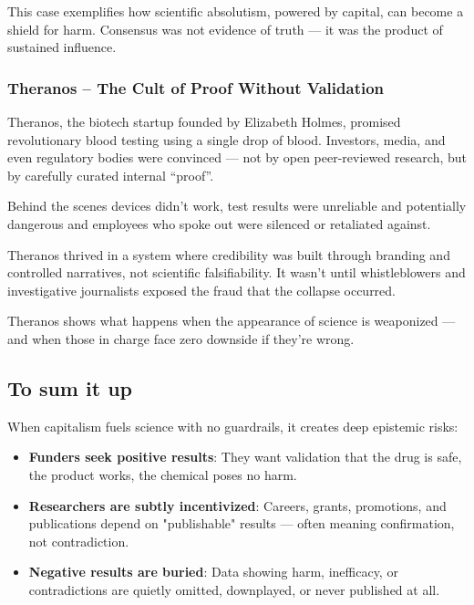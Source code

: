 This case exemplifies how scientific absolutism, powered by capital, can become a shield for harm. Consensus was not evidence of truth — it was the product of sustained influence.

\cite{GLENNA2021104290}
\cite{mindthegap2020}
\cite{ehn2018}

\subsubsection{Theranos – The Cult of Proof Without Validation}

Theranos, the biotech startup founded by Elizabeth Holmes, promised revolutionary blood testing using a
single drop of blood. Investors, media, and even regulatory bodies were convinced — not by open
peer-reviewed research, but by carefully curated internal “proof”.

Behind the scenes devices didn't work, test results were unreliable and potentially dangerous and employees who spoke out were silenced or retaliated against.

Theranos thrived in a system where credibility was built through branding and controlled narratives, not 
scientific falsifiability. It wasn't until whistleblowers and investigative journalists exposed the fraud
that the collapse occurred.

Theranos shows what happens when the appearance of science is weaponized — and when those in charge face
zero downside if they’re wrong.

\cite{USvsHolmes2022}
\cite{buzzfeednews2018}
\cite{justivegove-theranos}

\subsection{To sum it up}

When capitalism fuels science with no guardrails, it creates deep epistemic risks:
\begin{itemize}
	\item \textbf{Funders seek positive results}: They want validation that the drug is safe, the product works, the chemical poses no harm.
	\item \textbf{Researchers are subtly incentivized}: Careers, grants, promotions, and publications depend on "publishable" results — often meaning confirmation, not contradiction.
	\item \textbf{Negative results are buried}: Data showing harm, inefficacy, or contradictions are quietly omitted, downplayed, or never published at all.
\end{itemize}

